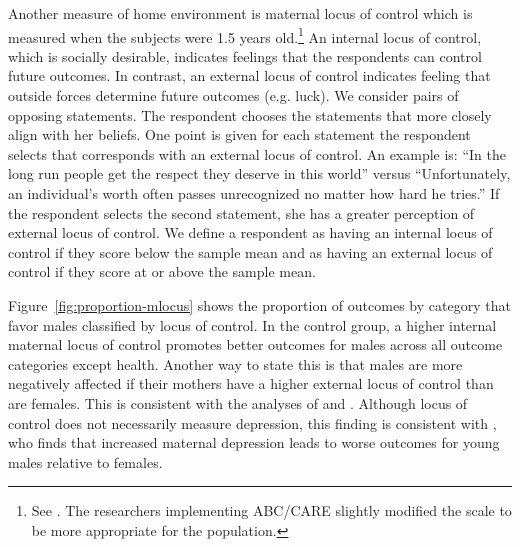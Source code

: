 Another measure of home environment is maternal locus of control which is measured when the subjects were 1.5 years old.\footnote{See \citet{Rotter_1966_PMGaA}. The researchers implementing ABC/CARE slightly modified the scale to be more appropriate for the population.} An internal locus of control, which is socially desirable, indicates feelings that the respondents can control future outcomes. In contrast, an external locus of control indicates feeling that outside forces determine future outcomes (e.g. luck). We consider pairs of opposing statements. The respondent chooses the statements that more closely align with her beliefs. One point is given for each statement the respondent selects that corresponds with an external locus of control. An example is: ``In the long run people get the respect they deserve in this world'' versus ``Unfortunately, an individual's worth often passes unrecognized no matter how hard he tries.'' If the respondent selects the second statement, she has a greater perception of external locus of control.  We define a respondent as having an internal locus of control if they score below the sample mean and as having an external locus of control if they score at or above the sample mean.

Figure~\ref{fig:proportion-mlocus} shows the proportion of outcomes by category that favor males classified by locus of control. In the control group, a higher internal maternal locus of control promotes better outcomes for males across all outcome categories except health. Another way to state this is that males are more negatively affected if their mothers have a higher external locus of control than are females. This is consistent with the analyses of \citet{Schore_2017_IMHJ} and \citet{golding2016psychology}. Although locus of control does not necessarily measure depression, this finding is consistent with \citet{Beeghly-etal_2017_IMHJ}, who finds that increased maternal depression leads to worse outcomes for young males relative to females.

